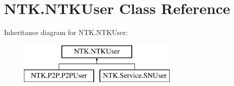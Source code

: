 \hypertarget{class_n_t_k_1_1_n_t_k_user}{}\section{N\+T\+K.\+N\+T\+K\+User Class Reference}
\label{class_n_t_k_1_1_n_t_k_user}


 


Inheritance diagram for N\+T\+K.\+N\+T\+K\+User\+:\begin{figure}[H]
\begin{center}
\leavevmode
\includegraphics[height=2.000000cm]{d1/dc2/class_n_t_k_1_1_n_t_k_user}
\end{center}
\end{figure}
